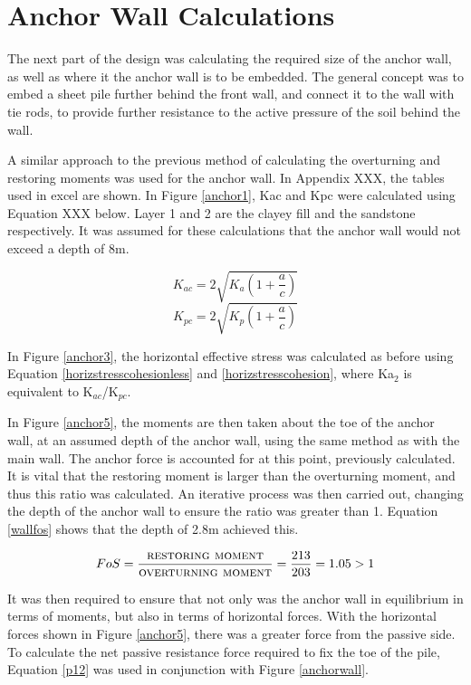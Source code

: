 \documentclass[12pt, a4paper]{article}
\begin{document}
\section{Anchor Wall Calculations}
The next part of the design was calculating the required size of the anchor wall, as well as where it the anchor wall is to be embedded. The general concept was to embed a sheet pile further behind the front wall, and connect it to the wall with tie rods, to provide further resistance to the active pressure of the soil behind the wall. 
\begin{justify}
A similar approach to the previous method of calculating the overturning and restoring moments was used for the anchor wall. In Appendix XXX, the tables used in excel are shown. In Figure \ref{anchor1}, Kac and Kpc were calculated using Equation XXX below. Layer 1 and 2 are the clayey fill and the sandstone respectively. It was assumed for these calculations that the anchor wall would not exceed a depth of 8m. 
\end{justify}
\begin{equation}
    K_{ac}=2\sqrt{K_a(1+\frac{a}{c})}
\end{equation}
\begin{equation}
     K_{pc}=2\sqrt{K_p(1+\frac{a}{c})}
\end{equation}
\begin{justify}
In Figure \ref{anchor3}, the horizontal effective stress was calculated as before using Equation \ref{horizstresscohesionless} and \ref{horizstresscohesion}, where Ka$_2$ is equivalent to K$_{ac}$/K$_{pc}$.
\end{justify}
\begin{justify}
In Figure \ref{anchor5}, the moments are then taken about the toe of the anchor wall, at an assumed depth of the anchor wall, using the same method as with the main wall. The anchor force is accounted for at this point, previously calculated. It is vital that the restoring moment is larger than the overturning moment, and thus this ratio was calculated. An iterative process was then carried out, changing the depth of the anchor wall to ensure the ratio was greater than 1. Equation \ref{wallfos} shows that the depth of 2.8m achieved this.
\end{justify}
\begin{equation}
      FoS=\frac{\textsc{restoring moment}}{\textsc{overturning moment}}=\frac{213}{203}=1.05>1
      \label{wallfos}
\end{equation}
\begin{justify}
It was then required to ensure that not only was the anchor wall in equilibrium in terms of moments, but also in terms of horizontal forces. With the horizontal forces  shown in Figure \ref{anchor5}, there was a greater force from the passive side. To calculate the net passive resistance force required to fix the toe of the pile, Equation \ref{p12} was used in conjunction with Figure \ref{anchorwall}.
\end{justify}
\end{document}
